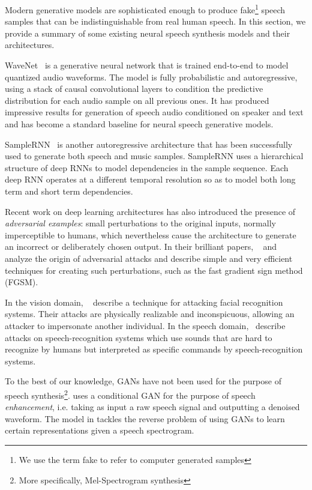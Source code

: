 Modern generative models are sophisticated enough to produce fake\footnote{We
use the term fake to refer to computer generated samples} speech samples that
can be indistinguishable from real human speech. In this section, we provide a
summary of some existing neural speech synthesis models and their architectures.

WaveNet~\cite{van2016wavenet} is a generative neural network that is trained
end-to-end to model quantized audio waveforms. The model is fully probabilistic
and autoregressive, using a stack of causal convolutional layers to condition
the predictive distribution for each audio sample on all previous ones. It has
produced impressive results for generation of speech audio conditioned on
speaker and text and has become a standard baseline for neural speech generative
models. 

SampleRNN~\cite{mehri2016samplernn} is another autoregressive architecture that
has been successfully used to generate both speech and music samples. SampleRNN
uses a hierarchical structure of deep RNNs to model dependencies in the sample
sequence. Each deep RNN operates at a different temporal resolution so as to
model both long term and short term dependencies. 

Recent work on deep learning architectures has also introduced the presence of
\textit{adversarial examples}: small perturbations to the original inputs,
normally imperceptible to humans, which nevertheless cause the architecture to
generate an incorrect or deliberately chosen output. In their brilliant papers,
~\cite{szegedy2013intriguing} and ~\cite{goodfellow2014explaining} analyze the
origin of adversarial attacks and describe simple and very efficient techniques
for creating such perturbations, such as the fast gradient sign method (FGSM). 

In the vision domain, ~\cite{sharif2016accessorize} describe a technique for
attacking facial recognition systems. Their attacks are physically realizable
and inconspicuous, allowing an attacker to impersonate another individual. In
the speech domain,~\cite{carlini2016hidden} describe attacks on
speech-recognition systems which use sounds that are hard to recognize by humans
but interpreted as specific commands by speech-recognition systems.

To the best of our knowledge, GANs have not been used for the purpose of speech
synthesis\footnote{More specifically, Mel-Spectrogram synthesis}.
\cite{pascual2017segan} uses a conditional GAN for the purpose of speech
\textit{enhancement}, i.e. taking as input a raw speech signal and outputting a
denoised waveform. The model in \cite{chang2017learning} tackles the reverse
problem of using GANs to learn certain representations given a speech
spectrogram.
